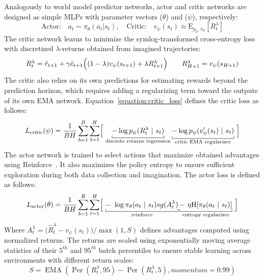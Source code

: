 Analogously to world model predictor networks, actor and critic networks are designed as simple MLPs with parameter vectors ($\theta$) and ($\psi$), respectively:
\begin{equation}
    \text{Actor:} \quad a_{t} \sim \pi_{\theta}(a_{t} | s_{t}), \quad \text{Critic:} \quad v_{\psi}(s_{t}) \approx \mathrm{E}_{p_{\phi}, \pi_{\theta}}[R^{\lambda}_{t}]
\end{equation}
The critic network learns to minimize the symlog-transformed cross-entropy loss~\citep{hafner2023mastering} with discretized $\lambda$-returns obtained from imagined trajectories: 
\begin{equation}
\setlength{\tabcolsep}{10pt}
\begin{tabular}{ll}
$R_{t}^{\lambda} = \hat{r}_{t+1} + \gamma \hat{c}_{t+1} \Bigl((1-\lambda)v_{\psi}(s_{t+1}) + \lambda R_{t+1}^{\lambda}\Bigr)$ & $R_{H+1}^{\lambda} = v_{\psi}(s_{H+1})$ 
\end{tabular}
\end{equation}
The critic also relies on its own predictions for estimating rewards beyond the prediction horizon, which requires adding a regularizing term toward the outputs of its own EMA network. Equation~\ref{equation:critic_loss} defines the critic loss as follows:
\begin{equation}
L_{\text{critic}}(\psi) = \frac{1}{BH}\sum_{b=1}^{B}\sum_{t=1}^{H}\Bigl[\ \underbracket[0.1ex]{-\log p_{\psi}(R_{t}^{\lambda} \ |\ s_{t})}_{\text{discrete returns regression}} \underbracket[0.1ex]{-\log p_{\psi}(v'_{\psi}(s_{t}) \ |\ s_{t})}_{\text{critic EMA regularizer}}\ \Bigr]
\label{equation:critic_loss}
\end{equation}
The actor network is trained to select actions that maximize obtained advantages using Reinforce~\citep{williams1992simple}. It also maximizes the policy entropy to ensure sufficient exploration during both data collection and imagination. The actor loss is defined as follows:
\begin{equation}
L_{\text{actor}}(\theta) = \frac{1}{BH}\sum_{b=1}^{B}\sum_{t=1}^{H}\Bigl[\ \underbracket[0.1ex]{-\ \log \pi_{\theta}(a_{t}\ |\ s_{t})sg(A_{t}^{\lambda})}_{\text{reinforce}} \underbracket[0.1ex]{-\ \eta \mathrm{H}[\pi_{\theta}(a_{t}\ |\ s_{t})]}_{\text{entropy regularizer}}\ \Bigr]
\end{equation}
Where $A_{t}^{\lambda}=\big(\hat{R}_{t}^{\lambda} - v_{\psi}(s_{t})\big) / \max(1, S)$ defines advantages computed using normalized returns. The returns are scaled using exponentially moving average statistics of their $5^{th}$ and $95^{th}$ batch percentiles to ensure stable learning across environments with different return scales:
\begin{equation}
S=\operatorname{EMA}(\operatorname{Per}(R_{t}^{\lambda}, 95) - \operatorname{Per}(R_{t}^{\lambda}, 5), momentum=0.99)
\end{equation}

